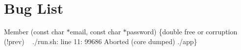 \chapter{Bug List}
\hypertarget{bug}{}\label{bug}

\begin{DoxyRefList}
\item[Member \doxylink{connect_8c_a51368b83540999728d4757464c351fab}{firebase\+\_\+sign\+\_\+in} (const char \texorpdfstring{$\ast$}{*}email, const char \texorpdfstring{$\ast$}{*}password)]\label{bug__bug000001}%
%
\{double free or corruption (!prev) ~\newline
./run.sh\+: line 11\+: 99686 Aborted (core dumped) ./app\} 
\end{DoxyRefList}
